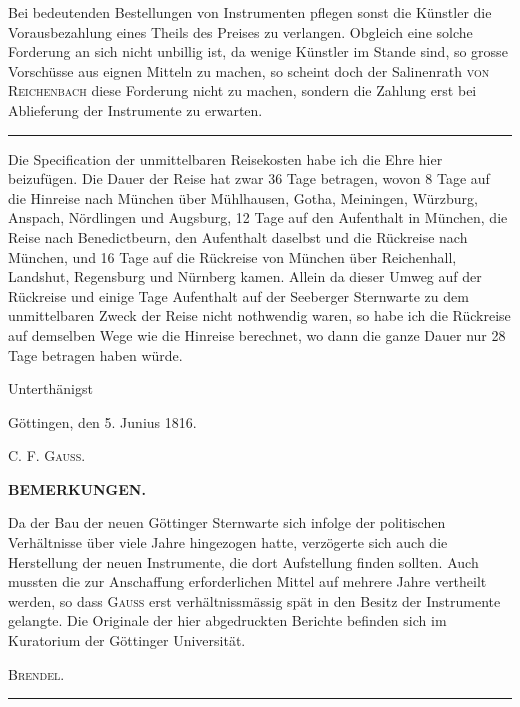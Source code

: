 Bei bedeutenden Bestellungen von Instrumenten pflegen sonst die Künstler die Vorausbezahlung eines Theils des Preises zu verlangen. Obgleich eine solche Forderung an sich nicht unbillig ist, da wenige Künstler im Stande sind, so grosse Vorschüsse aus eignen Mitteln zu machen, so scheint doch der Salinenrath \textsc{von Reichenbach} diese Forderung nicht zu machen, sondern die Zahlung erst bei Ablieferung der Instrumente zu erwarten.
\begin{center}\rule{.18\textwidth}{.35pt}\end{center}
\noindent\hspace*{\parindent}Die Specification der unmittelbaren Reisekosten habe ich die Ehre hier beizufügen. Die Dauer der Reise hat zwar 36 Tage betragen, wovon 8 Tage auf die Hinreise nach München über Mühlhausen, Gotha, Meiningen, Würzburg, Anspach, Nördlingen und Augsburg, 12 Tage auf den Aufenthalt in München, die Reise nach Benedictbeurn, den Aufenthalt daselbst und die Rückreise nach München, und 16 Tage auf die Rückreise von München über Reichenhall, Landshut, Regensburg und Nürnberg kamen. Allein da dieser Umweg auf der Rückreise und einige Tage Aufenthalt auf der Seeberger Sternwarte zu dem unmittelbaren Zweck der Reise nicht nothwendig waren,
\clearpage{}
\noindent so habe ich die Rückreise auf demselben Wege wie die Hinreise berechnet, wo dann die ganze Dauer nur 28 Tage betragen haben würde.
\begin{flushright}Unterthänigst\end{flushright}
Göttingen, den 5. Junius 1816.
\begin{flushright}C. F. \textsc{Gauss}.\end{flushright}
\bigskip
\begin{center}\textbf{BEMERKUNGEN.}\end{center}
\begingroup\small
\noindent\hspace*{\parindent}Da der Bau der neuen Göttinger Sternwarte sich infolge der politischen Verhältnisse über viele Jahre hingezogen hatte, verzögerte sich auch die Herstellung der neuen Instrumente, die dort Aufstellung finden sollten. Auch mussten die zur Anschaffung erforderlichen Mittel auf mehrere Jahre vertheilt werden, so dass \textsc{Gauss} erst verhältnissmässig spät in den Besitz der Instrumente gelangte. Die Originale der hier abgedruckten Berichte befinden sich im Kuratorium der Göttinger Universität.
\begin{flushright}\textsc{Brendel}.\end{flushright}\par\endgroup
\begin{center}\rule{.24\textwidth}{.35pt}\end{center}
\clearpage\endgroup
